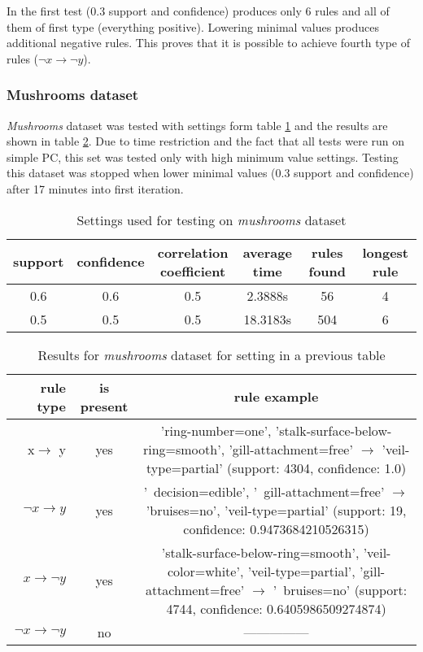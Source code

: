 \documentclass{article}
\begin{document}
 	In the first test (0.3 support and confidence) produces only 6 rules and all of them of first type (everything positive). Lowering minimal values produces additional negative rules. This proves that it is possible to achieve fourth type of rules ($\neg x\rightarrow \neg y$).
	 
	\subsubsection{Mushrooms dataset}
	\textit{Mushrooms} dataset was tested with settings form table \ref{ms} and the results are shown in table \ref{mr}. Due to time restriction and the fact that all tests were run on simple PC, this set was tested only with high minimum value settings. Testing this dataset was stopped when lower minimal values (0.3 support and confidence) after 17 minutes into first iteration.
	
	\begin{table}[H]
		\centering
		\label{ms}
		\begin{tabular}{c |c |c|c|c|c}
			support&confidence&\makecell{correlation\\coefficient}&average time&rules found&longest rule\\
			\hline
			\hline
			0.6&0.6&0.5&2.3888s&56&4\\
			\hline
			0.5&0.5&0.5&18.3183s&504&6\\
		\end{tabular}
		\caption{Settings used for testing on \textit{mushrooms} dataset}
	\end{table}
	\begin{table}[H]
		\centering
		\label{mr}
		\begin{tabular}{r|c |c}
			rule type& is present & rule example\\
			\hline
			\hline
			x$\rightarrow$ y & yes &\makecell{'ring-number=one', 'stalk-surface-below-ring=smooth',\\ 'gill-attachment=free' $\rightarrow$\\ 'veil-type=partial'\\ (support: 4304, confidence: 1.0)} \\
			\hline
			$\neg x\rightarrow y$ & yes &\makecell{'~decision=edible', '~gill-attachment=free' $\rightarrow$\\ 'bruises=no', 'veil-type=partial'\\ (support: 19, confidence: 0.9473684210526315)}\\
			\hline
			$x\rightarrow \neg y $& yes &\makecell{'stalk-surface-below-ring=smooth', 'veil-color=white',\\ 'veil-type=partial', 'gill-attachment=free' $\rightarrow$\\ '~bruises=no'\\ (support: 4744, confidence: 0.6405986509274874)}\\
			\hline
			$\neg x\rightarrow \neg y $& no &--------------- \\ 
		\end{tabular}
		\caption{Results for \textit{mushrooms} dataset for setting in a previous table}
	\end{table}
	
\end{document}
